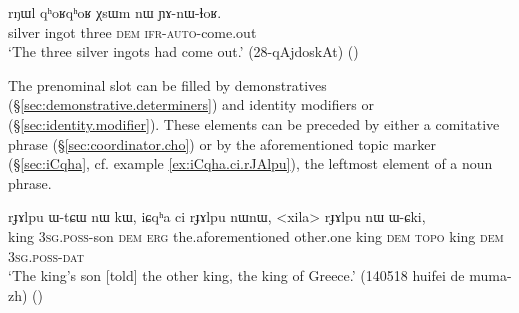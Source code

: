  \begin{exe}
\ex \label{ex:rNWl.qhoRqhoR}
\gll  rŋɯl qʰoʁqʰoʁ χsɯm nɯ ɲɤ-nɯ-ɬoʁ. \\
silver ingot three \textsc{dem} \textsc{ifr}-\textsc{auto}-come.out \\
\glt `The three silver ingots had come out.' (28-qAjdoskAt)
()
\end{exe}

The prenominal slot can be filled by demonstratives (§\ref{sec:demonstrative.determiners}) and identity modifiers  or  (§\ref{sec:identity.modifier}). These elements can be preceded by either a comitative  phrase (§\ref{sec:coordinator.cho}) or by the aforementioned topic marker  (§\ref{sec:iCqha}, cf. example \ref{ex:iCqha.ci.rJAlpu}), the leftmost element of a noun phrase.

 \begin{exe}
\ex \label{ex:iCqha.ci.rJAlpu}
\gll rɟɤlpu ɯ-tɕɯ nɯ kɯ, iɕqʰa ci rɟɤlpu nɯnɯ, <xila> rɟɤlpu nɯ ɯ-ɕki, \\
king \textsc{3sg}.\textsc{poss}-son \textsc{dem} \textsc{erg} the.aforementioned other.one king \textsc{dem}  \textsc{topo} king \textsc{dem} \textsc{3sg}.\textsc{poss}-\textsc{dat} \\
\glt `The king's son [told] the other king, the king of Greece.' (140518 huifei de muma-zh)
()
\end{exe}

 